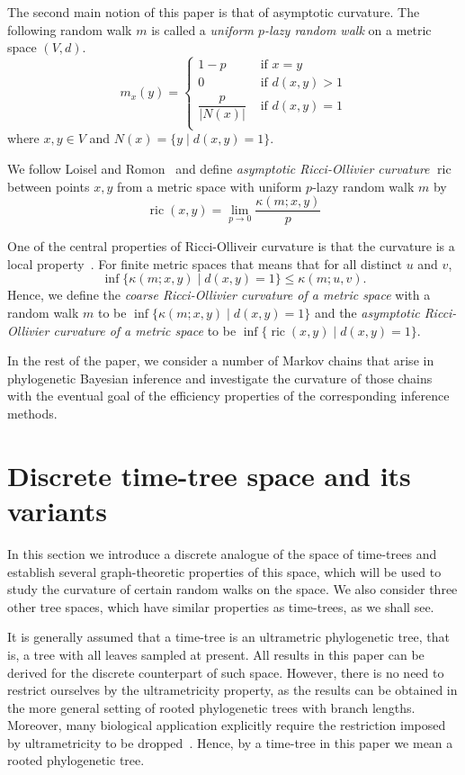 \documentclass{amsart}
\newcommand{\ric}{\operatorname{ric}}
\begin{document}
The second main notion of this paper is that of asymptotic curvature.
The following random walk $m$ is called a {\em uniform $p$-lazy random walk} on a metric space $(V,d)$.
\[
m_x(y) =
\begin{cases}
1-p				& \mbox{ if } x=y \\
0   				& \mbox{ if } d(x,y) > 1 \\
\dfrac{p}{|N(x)|}  & \mbox{ if } d(x,y) = 1 \\
\end{cases}
\]
where $x,y \in V$ and $N(x) = \{y \mid d(x,y) = 1\}$.

We follow Loisel and Romon~\cite{Loisel2014-gu} and define {\em asymptotic Ricci-Ollivier curvature} $\ric$ between points $x,y$ from a metric space with uniform $p$-lazy random walk $m$ by 
\[
\ric(x,y) = \lim_{p\to0} \frac{\kappa(m;x,y)}{p}
\]

One of the central properties of Ricci-Olliveir curvature is that the curvature is a local property~\cite{Ollivier2009-cj}.
For finite metric spaces that means that for all distinct $u$ and $v$,
\[
\inf\{\kappa(m;x,y)\mid d(x,y) = 1\} \leq \kappa(m;u,v).
\]
Hence, we define the {\em coarse Ricci-Ollivier curvature of a metric space} with a random walk $m$ to be $\inf\{\kappa(m;x,y)\mid d(x,y) = 1\}$ and the {\em asymptotic Ricci-Ollivier curvature of a metric space} to be $\inf\{\ric(x,y)\mid d(x,y) = 1\}$.

In the rest of the paper, we consider a number of Markov chains that arise in phylogenetic Bayesian inference and investigate the curvature of those chains with the eventual goal of the efficiency properties of the corresponding inference methods.

\section{Discrete time-tree space and its variants}

In this section we introduce a discrete analogue of the space of time-trees and establish several graph-theoretic properties of this space, which will be used to study the curvature of certain random walks on the space.
We also consider three other tree spaces, which have similar properties as time-trees, as we shall see.

It is generally assumed that a time-tree is an ultrametric phylogenetic tree, that is, a tree with all leaves sampled at present.
All results in this paper can be derived for the discrete counterpart of such space.
However, there is no need to restrict ourselves by the ultrametricity property, as the results can be obtained in the more general setting of rooted phylogenetic trees with branch lengths.
Moreover, many biological application explicitly require the restriction imposed by ultrametricity to be dropped~\cite{Gavryushkina2014-xd}.
Hence, by a time-tree in this paper we mean a rooted phylogenetic tree.
\end{document}
